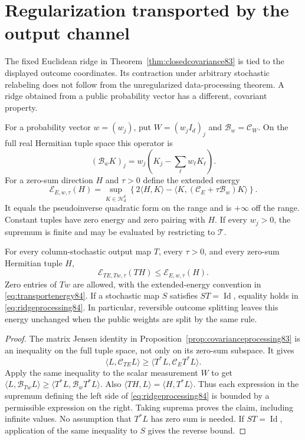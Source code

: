 \section{Regularization transported by the output channel}\label{sec:ridge84}
The fixed Euclidean ridge in Theorem~\ref{thm:closedcovariance83}
is tied to the displayed outcome coordinates.  Its contraction under
arbitrary stochastic relabeling does not follow from the
unregularized data-processing theorem.  A ridge obtained from a
public probability vector has a different, covariant property.

For a probability vector $w=(w_j)$, put $W=(w_jI_d)_j$ and
$\mathcal B_w=\mathcal C_W$.  On the full real Hermitian tuple
space this operator is
\begin{equation}\label{eq:weightedridge84}
 (\mathcal B_wK)_j=w_j\left(K_j-\sum_\ell w_\ell K_\ell\right).
\end{equation}
For a zero-sum direction $H$ and $\tau>0$ define the extended energy
\begin{equation}\label{eq:transportenergy84}
 \mathcal E_{E,w,\tau}(H)=\sup_{K\in\mathcal H_d^k}
 \left\{2\langle H,K\rangle-
       \langle K,(\mathcal C_E+\tau\mathcal B_w)K\rangle\right\}.
\end{equation}
It equals the pseudoinverse quadratic form on the range and is
$+\infty$ off the range.  Constant tuples have zero energy and
zero pairing with $H$.  If every $w_j>0$, the supremum is finite
and may be evaluated by restricting to $\mathcal T$.

\begin{theorem}\label{thm:transportedridge84}
For every column-stochastic output map $T$, every $\tau>0$, and
every zero-sum Hermitian tuple $H$,
\begin{equation}\label{eq:ridgeprocessing84}
 \mathcal E_{TE,Tw,\tau}(TH)\le\mathcal E_{E,w,\tau}(H).
\end{equation}
Zero entries of $Tw$ are allowed, with the extended-energy convention
in \eqref{eq:transportenergy84}.  If a stochastic map $S$ satisfies
$ST=\operatorname{Id}$, equality holds in
\eqref{eq:ridgeprocessing84}.  In particular, reversible outcome
splitting leaves this energy unchanged when the public weights
are split by the same rule.
\end{theorem}
\begin{proof}
The matrix Jensen identity in
Proposition~\ref{prop:covarianceprocessing83} is an inequality on
the full tuple space, not only on its zero-sum subspace.  It gives
\[
 \langle L,\mathcal C_{TE}L\rangle
 \ge\langle T^*L,\mathcal C_E T^*L\rangle.
\]
Apply the same inequality to the scalar measurement $W$ to get
$\langle L,\mathcal B_{Tw}L\rangle
\ge\langle T^*L,\mathcal B_wT^*L\rangle$.
Also $\langle TH,L\rangle=\langle H,T^*L\rangle$.
Thus each expression in the supremum defining the left side of
\eqref{eq:ridgeprocessing84} is bounded by a permissible expression
on the right.  Taking suprema proves the claim, including infinite
values.  No assumption that $T^*L$ has zero sum is needed.
If $ST=\operatorname{Id}$, application of the same inequality to
$S$ gives the reverse bound.
\end{proof}

